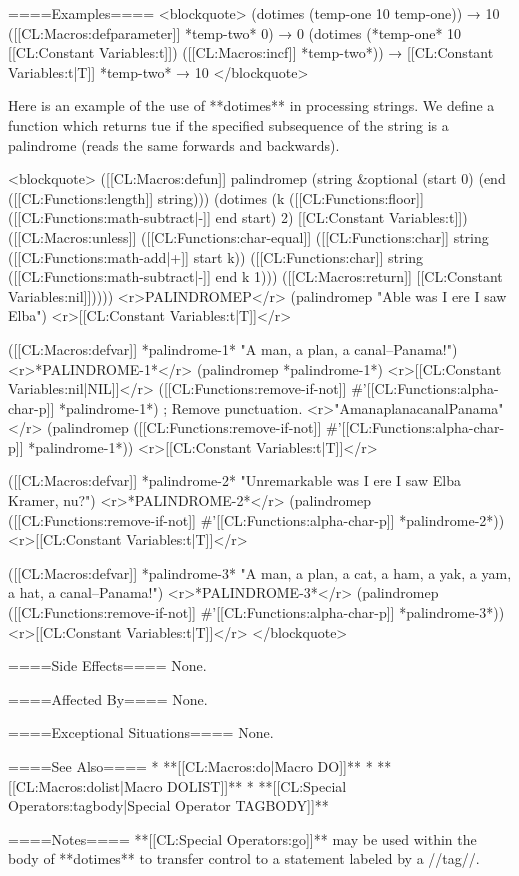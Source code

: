 ====Examples====
<blockquote>
(dotimes (temp-one 10 temp-one)) → 10
([[CL:Macros:defparameter]] *temp-two* 0) → 0
(dotimes (*temp-one* 10 [[CL:Constant Variables:t]]) ([[CL:Macros:incf]] *temp-two*)) → [[CL:Constant Variables:t|T]]
*temp-two* → 10 
</blockquote>

Here is an example of the use of **dotimes** in processing strings. We define a function which returns tue if the specified subsequence of the string is a palindrome (reads the same forwards and backwards).

<blockquote>
([[CL:Macros:defun]] palindromep (string &optional (start 0) (end ([[CL:Functions:length]] string))) 
  (dotimes (k ([[CL:Functions:floor]] ([[CL:Functions:math-subtract|-]] end start) 2) [[CL:Constant Variables:t]]) 
    ([[CL:Macros:unless]] ([[CL:Functions:char-equal]] ([[CL:Functions:char]] string ([[CL:Functions:math-add|+]] start k)) 
            ([[CL:Functions:char]] string ([[CL:Functions:math-subtract|-]] end k 1)))
      ([[CL:Macros:return]] [[CL:Constant Variables:nil]])))) <r>PALINDROMEP</r>
(palindromep "Able was I ere I saw Elba") <r>[[CL:Constant Variables:t|T]]</r>

([[CL:Macros:defvar]] *palindrome-1* 
  "A man, a plan, a canal--Panama!") <r>*PALINDROME-1*</r>
(palindromep *palindrome-1*) <r>[[CL:Constant Variables:nil|NIL]]</r>
([[CL:Functions:remove-if-not]] #'[[CL:Functions:alpha-char-p]] *palindrome-1*) ; Remove punctuation. 
<r>"AmanaplanacanalPanama"</r>
(palindromep ([[CL:Functions:remove-if-not]] #'[[CL:Functions:alpha-char-p]] *palindrome-1*)) <r>[[CL:Constant Variables:t|T]]</r>

([[CL:Macros:defvar]] *palindrome-2* 
  "Unremarkable was I ere I saw Elba Kramer, nu?") <r>*PALINDROME-2*</r>
(palindromep ([[CL:Functions:remove-if-not]] #'[[CL:Functions:alpha-char-p]] *palindrome-2*)) <r>[[CL:Constant Variables:t|T]]</r>

([[CL:Macros:defvar]] *palindrome-3*
  "A man, a plan, a cat, a ham, a yak, a yam, a hat, a canal--Panama!") <r>*PALINDROME-3*</r>
(palindromep ([[CL:Functions:remove-if-not]] #'[[CL:Functions:alpha-char-p]] *palindrome-3*)) <r>[[CL:Constant Variables:t|T]]</r>
</blockquote>

====Side Effects====
None.

====Affected By====
None.

====Exceptional Situations====
None.

====See Also====
  * **[[CL:Macros:do|Macro DO]]**
  * **[[CL:Macros:dolist|Macro DOLIST]]**
  * **[[CL:Special Operators:tagbody|Special Operator TAGBODY]]**

====Notes====
**[[CL:Special Operators:go]]** may be used within the body of **dotimes** to transfer control to a statement labeled by a //tag//.

